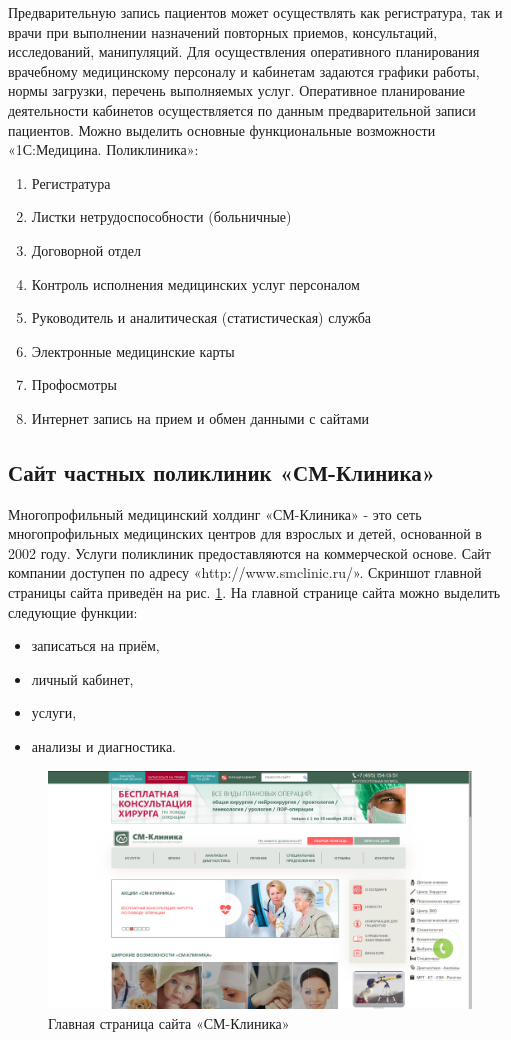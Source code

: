 \documentclass[14pt,a4paper,russian]{extreport}
\begin{document}
Предварительную запись пациентов может осуществлять как регистратура, так и врачи при выполнении
назначений повторных приемов, консультаций, исследований, манипуляций. Для осуществления
оперативного планирования врачебному медицинскому персоналу и кабинетам задаются графики работы,
нормы загрузки, перечень выполняемых услуг. Оперативное планирование деятельности кабинетов
осуществляется по данным предварительной записи пациентов.\cite{1cclinic}
Можно выделить основные функциональные возможности «1С:Медицина. Поликлиника»:
\begin{enumerate}[noitemsep]
    \item Регистратура
    \item Листки нетрудоспособности (больничные)
    \item Договорной отдел
    \item Контроль исполнения медицинских услуг персоналом
    \item Руководитель и аналитическая (статистическая) служба
    \item Электронные медицинские карты
    \item Профосмотры
    \item Интернет запись на прием и обмен данными с сайтами
\end{enumerate}

\subsection{Сайт частных поликлиник «СМ-Клиника»}
Многопрофильный медицинский холдинг «СМ-Клиника»  - это сеть многопрофильных
медицинских центров для взрослых и детей, основанной в 2002 году. Услуги поликлиник предоставляются
на коммерческой основе.
Сайт компании доступен по адресу «http://www.smclinic.ru/».
Скриншот главной страницы сайта приведён на рис. \ref{fig:cc}.
На главной странице сайта можно выделить следующие функции:
\begin{itemize}[noitemsep]
    \item записаться на приём,
    \item личный кабинет, 
    \item услуги,
    \item анализы и диагностика.
\end{itemize}


\begin{figure}[t!]
        \includegraphics[width=\textwidth]{cmclinic}
        \caption{Главная страница сайта «СМ-Клиника»}
        \label{fig:cc}
\end{figure}
\end{document}
